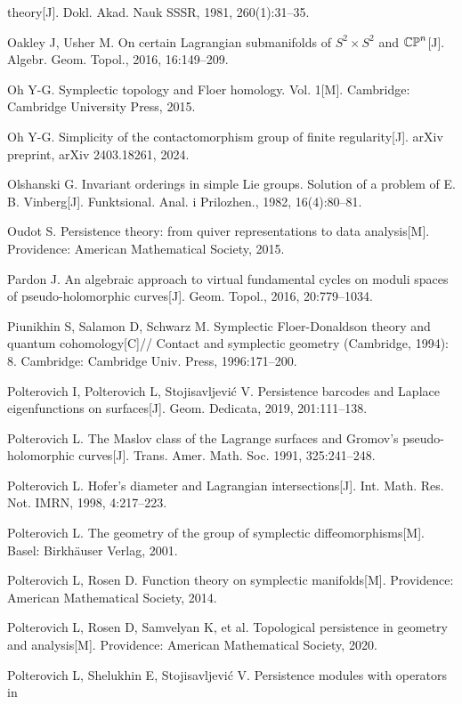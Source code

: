 \begin{enumerate}[label={[\arabic*]},leftmargin=3.2em,itemsep=2pt,parsep=0pt]
        theory[J]. Dokl. Akad. Nauk SSSR, 1981, 260(1):31--35.
  \item Oakley J, Usher M. On certain Lagrangian submanifolds of $S^2\times S^2$ and
        $\mathbb{CP}^n$[J]. Algebr. Geom. Topol., 2016, 16:149--209.
  \item Oh Y-G. Symplectic topology and Floer homology. Vol. 1[M]. Cambridge: Cambridge
        University Press, 2015.
  \item Oh Y-G. Simplicity of the contactomorphism group of finite regularity[J]. arXiv
        preprint, arXiv 2403.18261, 2024.
  \item Olshanski G. Invariant orderings in simple Lie groups. Solution of a problem of
        E. B. Vinberg[J]. Funktsional. Anal. i Prilozhen., 1982, 16(4):80--81.
  \item Oudot S. Persistence theory: from quiver representations to data analysis[M].
        Providence: American Mathematical Society, 2015.
  \item Pardon J. An algebraic approach to virtual fundamental cycles on moduli spaces of
        pseudo-holomorphic curves[J]. Geom. Topol., 2016, 20:779--1034.
  \item Piunikhin S, Salamon D, Schwarz M. Symplectic Floer-Donaldson theory and quantum
        cohomology[C]// Contact and symplectic geometry (Cambridge, 1994): 8. Cambridge:
        Cambridge Univ. Press, 1996:171--200.
  \item Polterovich I, Polterovich L, Stojisavljević V. Persistence barcodes and Laplace
        eigenfunctions on surfaces[J]. Geom. Dedicata, 2019, 201:111--138.
  \item Polterovich L. The Maslov class of the Lagrange surfaces and Gromov's
        pseudo-holomorphic curves[J]. Trans. Amer. Math. Soc. 1991, 325:241--248.
  \item Polterovich L. Hofer's diameter and Lagrangian intersections[J]. Int. Math. Res.
        Not. IMRN, 1998, 4:217--223.
  \item Polterovich L. The geometry of the group of symplectic diffeomorphisms[M]. Basel:
        Birkhäuser Verlag, 2001.
  \item Polterovich L, Rosen D. Function theory on symplectic manifolds[M]. Providence:
        American Mathematical Society, 2014.
  \item Polterovich L, Rosen D, Samvelyan K, et al. Topological persistence in geometry and
        analysis[M]. Providence: American Mathematical Society, 2020.
  \item Polterovich L, Shelukhin E, Stojisavljević V. Persistence modules with operators in

\end{enumerate}
